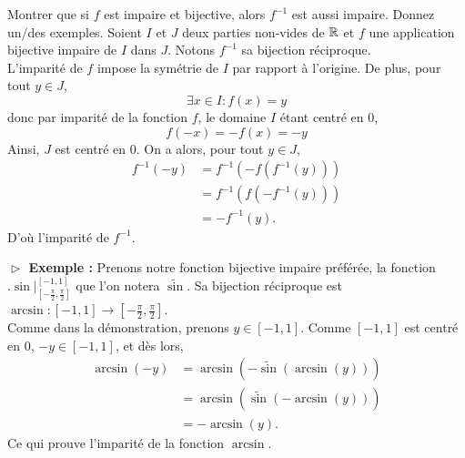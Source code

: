 \documentclass{article}
\begin{document}
\begin{question_kholle}{Montrer que si $f$ est impaire et bijective, alors $f^{-1}$ est aussi impaire. Donnez un/des exemples.}
	Soient $I$ et $J$ deux parties non-vides de $\mathbb R$ et $f$ une application bijective impaire de $I$ dans $J$. Notons $f^{-1}$ sa bijection réciproque.\\
	L'imparité de $f$ impose la symétrie de $I$ par rapport à l'origine. De plus, pour tout $y\in J$,
	\[
		\exists{x}\in I: f(x)=y
	\]
	donc par imparité de la fonction $f$, le domaine $I$ étant centré en $0$,
	\[
		f(-x)=-f(x)=-y
	\]
	Ainsi, $J$ est centré en $0$. On a alors, pour tout $y\in J$,
	\begin{align*}
		f^{-1}(-y) & = f^{-1}(-f(f^{-1}(y))) \\
		           & = f^{-1}(f(-f^{-1}(y))) \\
		           & = -f^{-1}(y).
	\end{align*}
	D'où l'imparité de $f^{-1}$.

	\noindent\textbf{$\vartriangleright$ Exemple :} Prenons notre fonction bijective impaire préférée, la fonction $\bigl.\sin\bigr|_{\left[ -\frac{\pi}{2}, \frac{\pi}{2}\right]}^{[-1,1]}$ que l'on notera $\widetilde{\sin}$. Sa bijection réciproque est $\arcsin : [-1,1] \to \left[ -\frac{\pi}{2}, \frac{\pi}{2}\right]$.\\
	Comme dans la démonstration, prenons $y\in [-1, 1]$. Comme $[-1,1]$ est centré en $0$, $-y\in [-1,1]$, et dès lors,
	\begin{align*}
		\arcsin(-y) & = \arcsin(-\widetilde{\sin}(\arcsin(y))) \\
		            & = \arcsin(\widetilde{\sin}(-\arcsin(y))) \\
		            & = -\arcsin(y).
	\end{align*}
	Ce qui prouve l'imparité de la fonction $\arcsin$.
\end{question_kholle}
\end{document}
